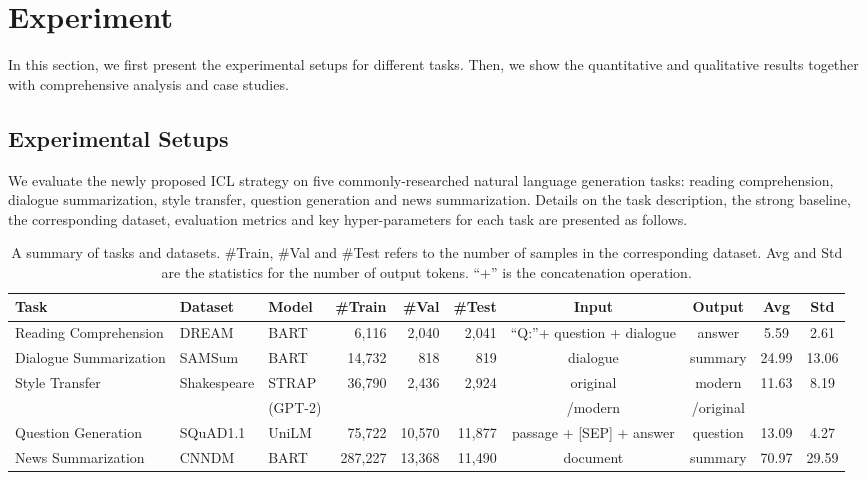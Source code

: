 \section{Experiment}
\label{sec:experiment}
In this section,
we first present the experimental setups for different tasks. Then, we show the quantitative and qualitative results together with comprehensive analysis and case studies.

\subsection{Experimental Setups}
\label{sec:implementation}
We evaluate the newly proposed ICL strategy on five commonly-researched natural language generation tasks: reading comprehension, dialogue summarization, style transfer, question generation and news summarization. Details on the task description, the strong baseline, the corresponding dataset, evaluation metrics and key hyper-parameters for each task are presented as follows.%

\begin{table*}[th]
	\scriptsize
	\centering
	\begin{tabular}{lp{1.1cm}p{0.9cm}rrrcccc}
		\hline
		Task & Dataset & Model & \#Train & \#Val & \#Test & Input & Output & Avg & Std\\
		\hline
		Reading Comprehension & DREAM &BART& 6,116 & 2,040 & 2,041 & ``Q:''+ question + dialogue & answer & 5.59 & 2.61\\
		Dialogue Summarization & SAMSum &BART& 14,732 & 818 & 819 & dialogue & summary  & 24.99 & 13.06\\
		\multirow{2}{*}{Style Transfer} & \multirow{2}{*}{Shakespeare} &{STRAP}&  \multirow{2}{*}{36,790} &  \multirow{2}{*}{2,436} &  \multirow{2}{*}{2,924} & {original}  & {modern}  &  \multirow{2}{*}{11.63} & \multirow{2}{*}{8.19} \\
		&&(GPT-2) &  & && /modern& /original & & \\
		Question Generation & SQuAD1.1 &UniLM& 75,722 & 10,570 & 11,877 & passage + [SEP] + answer & question & 13.09 & 4.27 \\
		News Summarization & CNNDM &BART& 287,227& 13,368& 11,490 & document & summary & 70.97 & 29.59\\ 
		\hline
	\end{tabular}
	\caption{A summary of tasks and datasets. \#Train, \#Val and \#Test refers to the number of samples in the corresponding dataset. Avg and Std are the statistics for the number of output tokens. ``+'' is the concatenation operation.}
	\label{tab:taskdata}
\end{table*}

